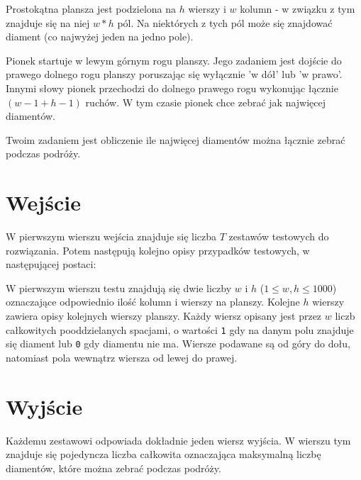 \documentclass{spiral-kurs}
\begin{document}
\makeheader
%

Prostokątna plansza jest podzielona na $h$ wierszy i $w$
kolumn - w związku z tym znajduje się na niej $w*h$ pól. Na niektórych
z tych pól może się znajdować diament (co najwyżej jeden na jedno pole).

Pionek startuje w lewym górnym rogu planszy. Jego zadaniem jest dojście do
prawego dolnego rogu planszy poruszając się wyłącznie 'w dół' lub 'w prawo'.
Innymi słowy pionek przechodzi do dolnego prawego rogu wykonując łącznie $(w-1 + h-1)$ ruchów. W tym czasie pionek
chce zebrać jak najwięcej diamentów.

Twoim zadaniem jest obliczenie ile najwięcej diamentów można łącznie zebrać
podczas podróży.


  \section{Wejście}

W pierwszym wierszu wejścia znajduje się liczba $T$ zestawów testowych do rozwiązania. Potem następują kolejno opisy przypadków testowych, w następującej postaci:

W pierwszym wierszu testu znajdują się dwie liczby $w$ i $h$
($1 \leq w, h \leq 1000$) oznaczające odpowiednio ilość kolumn i wierszy na
planszy.
Kolejne $h$ wierszy zawiera opisy kolejnych wierszy planszy. Każdy
wiersz opisany jest przez $w$ liczb całkowitych pooddzielanych spacjami,
o wartości \verb"1" gdy na danym polu znajduje się diament lub \verb"0" gdy diamentu nie ma.
Wiersze podawane są od góry do dołu, natomiast pola wewnątrz wiersza od lewej
do prawej.

  \section{Wyjście}
Każdemu zestawowi odpowiada dokładnie jeden wiersz wyjścia. W wierszu tym
znajduje się pojedyncza liczba całkowita oznaczająca maksymalną liczbę
diamentów, które można zebrać podczas podróży.





  
\end{document}
